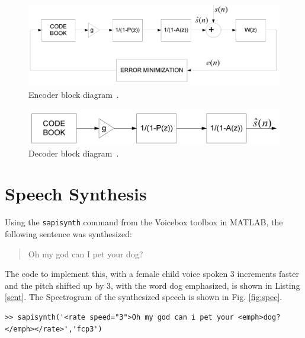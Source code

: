 \documentclass[letterpaper]{article}
\begin{document}
\begin{figure}[h!]
    \centering
    \includegraphics[width=12cm]{encoder}
    \caption{Encoder block diagram~\cite{msr}.}
    \label{fig:enc}
\end{figure}


\begin{figure}[h!]
    \centering
    \includegraphics[width=12cm]{decoder}
    \caption{Decoder block diagram~\cite{msr}.}
    \label{fig:dec}
\end{figure}



\section{Speech Synthesis}
Using the \texttt{sapisynth} command from the Voicebox toolbox in MATLAB, the following sentence was synthesized:
\begin{quote}
    Oh my god can I pet your dog?
\end{quote}

The code to implement this, with a female child voice spoken 3 increments faster and the pitch shifted up by 3, with the word dog emphasized, is shown in Listing \ref{sent}.
The Spectrogram of the synthesized speech is shown in Fig. \ref{fig:spec}.


\begin{lstlisting}[caption = {Sentence of speech that was synthesized.},label={sent}]
>> sapisynth('<rate speed="3">Oh my god can i pet your <emph>dog?</emph></rate>','fcp3')


\end{lstlisting}
\end{document}
